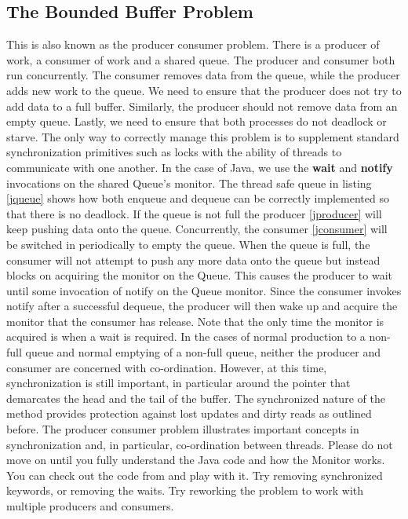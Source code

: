 \documentclass[10pt,a4paper]{article}
\begin{document}
\subsection{The Bounded Buffer Problem}
This is also known as the producer consumer problem. There is a producer of work, a consumer of work and a shared queue. The producer and consumer both run concurrently. The consumer removes data from the queue, while the producer adds new work to the queue. We need to ensure that the producer does not try to add data to a full buffer. Similarly, the producer should not remove data from an empty queue. Lastly, we need to ensure that both processes do not deadlock or starve. The only way to correctly manage this problem is to supplement standard synchronization primitives such as locks with the ability of threads to communicate with one another. In the case of Java, we use the {\bf wait} and {\bf notify} invocations on the shared Queue's monitor. The thread safe queue in listing \ref{jqueue} shows how both enqueue and dequeue can be correctly implemented so that there is no deadlock. If the queue is not full the producer \ref{jproducer} will keep pushing data onto the queue. Concurrently, the consumer \ref{jconsumer} will be switched in periodically to empty the queue. When the queue is full, the consumer will not attempt to push any more data onto the queue but instead blocks on acquiring the monitor on the Queue. This causes the producer to wait until some invocation of notify on the Queue monitor. Since the consumer invokes notify after a successful dequeue, the producer will then wake up and acquire the monitor that the consumer has release. Note that the only time the monitor is acquired is when a wait is required. In the cases of normal production to a non-full queue and normal emptying of a non-full queue, neither the producer and consumer are concerned with co-ordination. However, at this time, synchronization is still important, in particular around the pointer that demarcates the head and the tail of the buffer. The synchronized nature of the method provides protection against lost updates and dirty reads as outlined before. 
\newline\newline
The producer consumer problem illustrates important concepts in synchronization and, in particular, co-ordination between threads. Please do not move on until you fully understand the Java code and how the Monitor works. You can check out the code from \cite{github} and play with it. Try removing synchronized keywords, or removing the waits. Try reworking the problem to work with multiple producers and consumers. 
\end{document}
